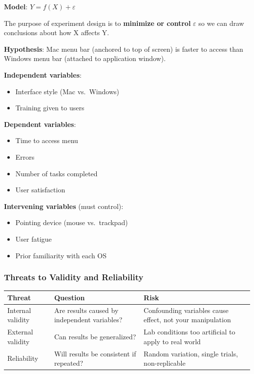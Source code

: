 \textbf{Model}: $Y = f(X) + \varepsilon$

The purpose of experiment design is to \textbf{minimize or control} $\varepsilon$ so we can draw conclusions about how X affects Y.

\begin{exbox}
\textbf{Hypothesis}: Mac menu bar (anchored to top of screen) is faster to access than Windows menu bar (attached to application window).

\textbf{Independent variables}:
\begin{itemize}
  \item Interface style (Mac vs.\ Windows)
  \item Training given to users
\end{itemize}

\textbf{Dependent variables}:
\begin{itemize}
  \item Time to access menu
  \item Errors
  \item Number of tasks completed
  \item User satisfaction
\end{itemize}

\textbf{Intervening variables} (must control):
\begin{itemize}
  \item Pointing device (mouse vs.\ trackpad)
  \item User fatigue
  \item Prior familiarity with each OS
\end{itemize}
\end{exbox}

\subsubsection*{Threats to Validity and Reliability}

\begin{center}
\renewcommand{\arraystretch}{1.3}
\begin{tabular}{@{} l p{5cm} p{5cm} @{}}
\toprule
\textbf{Threat} & \textbf{Question} & \textbf{Risk} \\
\midrule
Internal validity & Are results caused by independent variables? & Confounding variables cause effect, not your manipulation \\
External validity & Can results be generalized? & Lab conditions too artificial to apply to real world \\
Reliability & Will results be consistent if repeated? & Random variation, single trials, non-replicable \\
\bottomrule
\end{tabular}
\end{center}

